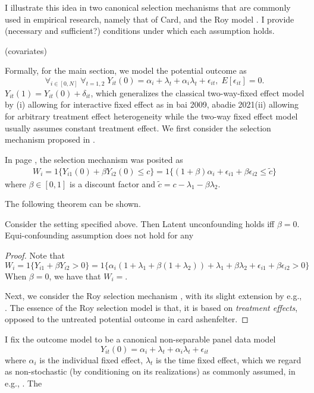 \documentclass[uplatex,dvipdfmx]{jsarticle}
\begin{document}
I illustrate this idea in two canonical selection mechanisms that are commonly used in empirical research, namely that of %
{Card}, and the Roy model \cite{roy1951some}.
I provide \koko(necessary and sufficient?) conditions under which each assumption holds.

\koko(covariates)

Formally, for the main section, we model the potential outcome as
\[\forall_{i\in[0,N]}\;\forall_{t=1,2}\;Y_{it} (0) = \alpha_i + \lambda_t + \alpha_i \lambda_t +\epsilon_{it},\; E[ \epsilon_{it} ] = 0.\]
$Y_{it}(1) = Y_{it}(0) + \delta_{it}$, which generalizes the classical two-way-fixed effect model by (i) allowing for interactive fixed effect as in %
{bai 2009, abadie 2021}(ii) allowing for arbitrary treatment effect heterogeneity while the two-way fixed effect model usually assumes constant treatment effect. 
We first consider the selection mechanism proposed in \cite{ashenfelter1985susing}.

In \cite{ashenfelter1985susing} page \koko , the selection mechanism was posited as 
\begin{align*}
     W_i = 1\{ Y_{i1}(0) + \beta Y_{i2} ( 0) \leq c \} =  1 \{  (1 + \beta ) \alpha_i + \epsilon_{i1} + \beta \epsilon_{i2} \leq \tilde{c} \}
\end{align*}
where $\beta \in [0,1]$ is a discount factor and $\tilde{c} = c - \lambda_1 - \beta \lambda_2$.

The following theorem can be shown.
\begin{theorem}
Consider the setting specified above. Then Latent unconfounding holds iff $\beta =0$. Equi-confounding assumption does not hold for any 
\end{theorem}
\begin{proof}
    Note that
    \[W_i = 1\{ Y_{i1} + \beta Y_{i2} > 0\} = 1\{ \alpha_i ( 1 + \lambda_1 + \beta( 1 + \lambda_2 ) ) + \lambda_1 + \beta \lambda_2 + \epsilon_{i1} + \beta \epsilon_{i2} > 0 \}\]
    When $\beta=0$, we have that $W_i =$.
    
    Next, we consider the Roy selection mechanism \cite{roy1951some}, with its slight extension by e.g., \cite{heckman1984method}.
    The essence of the Roy selection model is that, it is based on \textit{treatment effects}, opposed to the untreated potential outcome in %
    {card ashenfelter}.
\end{proof}

I fix the outcome model to be a canonical non-separable panel data model
\[Y_{it} (0) = \alpha_i + \lambda_t + \alpha_i \lambda_t + \epsilon_{it}\]
where $\alpha_i $ is the individual fixed effect, $\lambda_t$ is the time fixed effect, which we regard as non-stochastic (by conditioning on its realizations) as commonly assumed, in e.g., \cite{ghanem2022selection,doi:10.1146/annurev-economics-111809-125139}. The 
\end{document}
